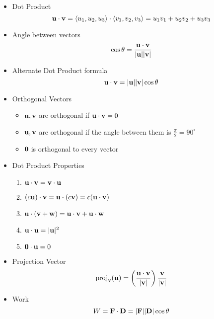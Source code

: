    \begin{itemize}
    \item Dot Product
      \[ \mathbf{u} \cdot \mathbf{v} = \left<u_1,u_2,u_3\right>\cdot\left<v_1,v_2,v_3\right> = u_1v_1 + u_2v_2 + u_3v_3 \]
  
    \item Angle between vectors
      \[\cos\theta = \frac{\mathbf{u}\cdot\mathbf{v}}{|\mathbf{u}||\mathbf{v}|}\] 
      
    \item Alternate Dot Product formula
      \[\mathbf{u} \cdot \mathbf{v} = |\mathbf{u}||\mathbf{v}|\cos \theta \]
      
    \item Orthogonal Vectors
      \begin{itemize}
      \item  $\mathbf{u},\mathbf{v}$ are orthogonal if $\mathbf{u} \cdot \mathbf{v} = 0$
      \item $\mathbf{u},\mathbf{v}$ are orthogonal if the angle between them is $\frac{\pi}{2} = 90^\circ$
      \item $\mathbf{0}$ is orthogonal to every vector
      \end{itemize}
    
    \item Dot Product Properties
      \begin{enumerate}
      \item $\mathbf{u} \cdot \mathbf{v} = \mathbf{v}\cdot\mathbf{u}$
      \item $(c\mathbf{u})\cdot \mathbf{v} = \mathbf{u} \cdot (c\mathbf{v}) = c(\mathbf{u} \cdot \mathbf{v})$
      \item $\mathbf{u} \cdot (\mathbf{v} + \mathbf{w}) = \mathbf{u}\cdot\mathbf{v} + \mathbf{u}\cdot \mathbf{w}$
      \item $\mathbf{u} \cdot \mathbf{u} = |\mathbf{u}|^2$
      \item $\mathbf{0} \cdot \mathbf{u} = 0$
      \end{enumerate}
    
    \item Projection Vector
      \[\textrm{proj}_{\mathbf{v}}(\mathbf{u}) = \left(\frac{\mathbf{u}\cdot\mathbf{v}}{|\mathbf{v}|} \right)\frac{\mathbf{v}}{|\mathbf{v}|}\]

    \item Work
      \[W = \mathbf{F} \cdot \mathbf{D} = |\mathbf{F}||\mathbf{D}|\cos \theta\]\
    
    \end{itemize}
  
